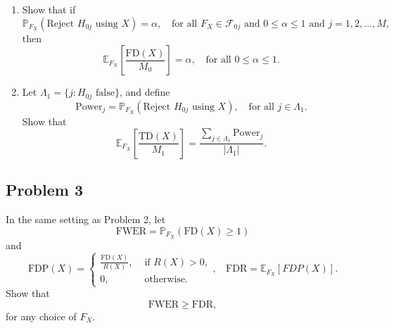 \documentclass[
  letterpaper,
  DIV=11,
  numbers=noendperiod]{scrartcl}
\providecommand{\tightlist}{%
  \setlength{\itemsep}{0pt}\setlength{\parskip}{0pt}}\usepackage{longtable,booktabs,array}
\begin{document}
\begin{enumerate}
\def\labelenumi{\arabic{enumi}.}
\tightlist
\item
  Show that if
  \[\mathbb{P}_{F_X}(\text{Reject } H_{0j} \text{ using } X) = \alpha, ~~~\text{ for all } F_X \in \mathcal{F}_{0j} \text{ and } 0 \leq \alpha \leq 1 \text{ and } j = 1, 2, \ldots, M,\]
  then
  \[ \mathbb{E}_{F_X} \left [ \frac{\mathrm{FD}(X)}{M_0} \right ] = \alpha, ~~~\text{ for all } 0 \leq \alpha \leq 1.\]
\item
  Let \(\Lambda_1 = \{j: H_{0j} \text{ false} \}\), and define\\
  \[\text{Power}_j = \mathbb{P}_{F_X}(\text{Reject } H_{0j} \text{ using } X), ~~~ \text{ for all } j \in \Lambda_1.\]
  Show that
  \[\mathbb{E}_{F_X} \left [ \frac{\mathrm{TD}(X)}{M_1} \right ] = \frac{\sum \limits_{j \in \Lambda_1} \text{Power}_j}{|\Lambda_1|}.\]
\end{enumerate}

\hypertarget{problem-3}{%
\subsection{Problem 3}\label{problem-3}}

In the same setting as Problem 2, let
\[\text{FWER} = \mathbb{P}_{F_X} ( \text{FD}(X) \geq 1)\] and
\[ \text{FDP}(X) = \begin{cases} \frac{\text{FD}(X)}{R(X)}, & \text{ if } R(X) > 0, \\ 
0, & \text{ otherwise.}
\end{cases}, ~~~~ \text{FDR} = \mathbb{E}_{F_X}[FDP(X)].\] Show that
\[ \text{FWER} \geq \text{FDR}, \] for any choice of \(F_X\).
\end{document}
